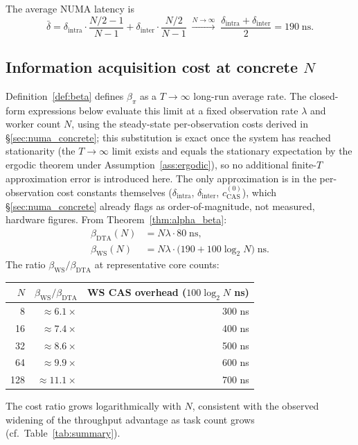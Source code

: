 \documentclass[11pt,a4paper]{report}
\begin{document}
The average NUMA latency is
\begin{equation}\label{eq:delta_bar_numa}
  \bar\delta
  = \delta_{\mathrm{intra}}\cdot\frac{N/2-1}{N-1}
  + \delta_{\mathrm{inter}}\cdot\frac{N/2}{N-1}
  \;\xrightarrow{N\to\infty}\;
  \frac{\delta_{\mathrm{intra}}+\delta_{\mathrm{inter}}}{2}
  = 190\;\mathrm{ns}.
\end{equation}

\subsection{Information acquisition cost at concrete $N$}

Definition~\ref{def:beta} defines $\beta_\pi$ as a $T \to \infty$
long-run average rate. The closed-form expressions below evaluate this
limit at a fixed observation rate $\lambda$ and worker count $N$, using
the steady-state per-observation costs derived in
\S\ref{sec:numa_concrete}; this substitution is exact once the system
has reached stationarity (the $T \to \infty$ limit exists and equals the
stationary expectation by the ergodic theorem under
Assumption~\ref{ass:ergodic}), so no additional finite-$T$ approximation
error is introduced here. The only approximation is in the per-observation
cost constants themselves ($\delta_{\mathrm{intra}}$, $\delta_{\mathrm{inter}}$,
$c_{\mathrm{CAS}}^{(0)}$), which \S\ref{sec:numa_concrete} already flags
as order-of-magnitude, not measured, hardware figures.
From Theorem~\ref{thm:alpha_beta}:
\begin{align}
  \beta_{\mathrm{DTA}}(N) &= N\lambda\cdot 80\;\mathrm{ns}, \label{eq:beta_dta_num}\\
  \beta_{\mathrm{WS}}(N)  &= N\lambda\cdot\bigl(190 + 100\log_2 N\bigr)\;\mathrm{ns}.
  \label{eq:beta_ws_num}
\end{align}
The ratio $\beta_{\mathrm{WS}}/\beta_{\mathrm{DTA}}$ at representative core counts:
\begin{center}
\begin{tabular}{rrr}
\toprule
$N$ & $\beta_{\mathrm{WS}}/\beta_{\mathrm{DTA}}$ & WS CAS overhead ($100\log_2 N$ ns)\\
\midrule
  8 & $\approx 6.1\times$ & 300 ns \\
 16 & $\approx 7.4\times$ & 400 ns \\
 32 & $\approx 8.6\times$ & 500 ns \\
 64 & $\approx 9.9\times$ & 600 ns \\
128 & $\approx 11.1\times$ & 700 ns \\
\end{tabular}
\end{center}
The cost ratio grows logarithmically with $N$, consistent with the
observed widening of the throughput advantage as task count grows
(cf.\ Table~\ref{tab:summary}).
\end{document}
